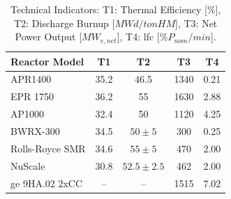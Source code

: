 \begin{table}[!ht]
    \centering
    \begin{tabularx}{0.7\textwidth}{Xcccc}
        \toprule
        \textbf{Reactor Model} & \textbf{T1} & \textbf{T2} & \textbf{T3} & \textbf{T4} \\
        \midrule
        APR1400         & 35.2 & 46.5 & 1340 & 0.21 \\
        EPR 1750        & 36.2 & 55   & 1630 & 2.88 \\
        AP1000          & 32.4 & 50   & 1120 & 4.25 \\
        BWRX-300        & 34.5 & $50 \pm 5$ & 300  & 0.25 \\
        Rolls-Royce SMR & 34.6 & $55 \pm 5$ & 470  & 2.00 \\
        NuScale         & 30.8 & $52.5 \pm 2.5$ & 462  & 2.00 \\
        \gls{ge} 9HA.02 2xCC & --   & --   & 1515 & 7.02 \\
        \bottomrule
    \end{tabularx}
    \caption{Technical Indicators: T1: Thermal Efficiency [\%], T2: Discharge Burnup [$MWd/tonHM$], T3: Net Power Output [$MW_{e,net}$], T4: \gls{lfc} [$\%P_{nom}/min$].}
    \label{tab:indicators-technical}
\end{table}


